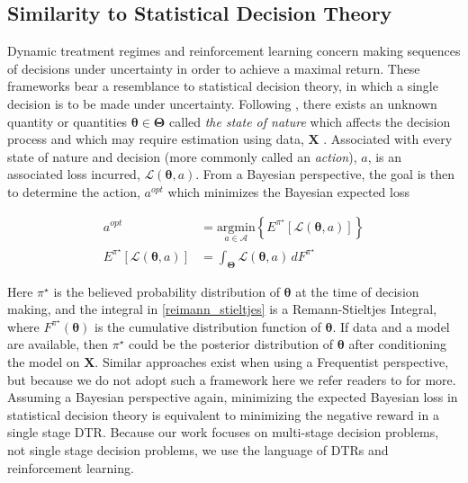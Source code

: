 \subsection{Similarity to Statistical Decision Theory}

Dynamic treatment regimes and reinforcement learning concern making sequences of decisions under uncertainty in order to achieve a maximal return.  These frameworks bear a resemblance to statistical decision theory, in which a single decision is to be made under uncertainty. Following \cite{berger2013statistical}, there exists an unknown quantity or quantities $\boldsymbol{\theta} \in \boldsymbol{\Theta}$ called \textit{the state of nature} which affects the decision process and  which may require estimation using data, $\mathbf{X}$ .  Associated with every state of nature and decision (more commonly called an \textit{action}), $a$, is an associated loss incurred, $\mathcal{L}(\boldsymbol{\theta}, a)$.  From a Bayesian perspective, the goal is then to determine the action, $a^{opt}$ which minimizes the Bayesian expected loss 


\begin{align}
	a^{opt} &= \underset{a \in \mathcal{A}}{\text{argmin}} \left\{ 	E^{\pi^\star}\left[ \mathcal{L}(\boldsymbol{\theta},a) \right] \right\} \\
	E^{\pi^\star}\left[ \mathcal{L}(\boldsymbol{\theta},a) \right] &= \int_{\boldsymbol{\Theta}} \mathcal{L}(\boldsymbol{\theta}, a) \, dF^{\pi^{\star}} \label{reimann_stieltjes}
\end{align}

\noindent Here $\pi^\star$ is the believed probability distribution of $\boldsymbol{\theta}$ at the time of decision making, and the integral in \cref{reimann_stieltjes} is a Remann-Stieltjes Integral, where $F^{\pi^\star}(\boldsymbol{\theta})$ is the cumulative distribution function of $ \boldsymbol{\theta} $.  If data and a model are available, then $\pi^{\star}$ could be the posterior distribution of $\boldsymbol{\theta}$ after conditioning the model on $\mathbf{X}$.  Similar approaches exist when using a Frequentist perspective, but because we do not adopt such a framework here  we refer readers to \cite{berger2013statistical} for more.  Assuming a Bayesian perspective again, minimizing the expected Bayesian loss in statistical decision theory is equivalent to minimizing the negative reward in a single stage DTR.  Because our work focuses on multi-stage decision problems, not single stage decision problems, we use the language of DTRs and reinforcement learning.


